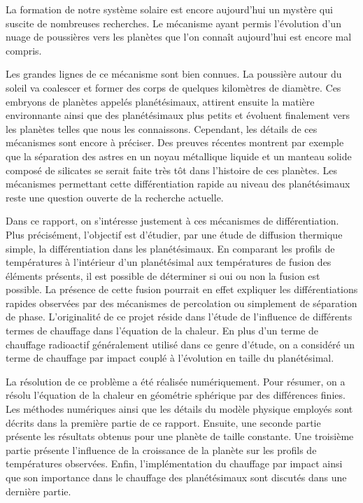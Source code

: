 \documentclass[10pt,a4paper]{article}
\numberwithin{equation}{section}
\begin{document}
La formation de notre système solaire est encore aujourd'hui un mystère qui suscite de nombreuses recherches. Le mécanisme ayant permis l'évolution d'un nuage de poussières vers les planètes que l'on connaît aujourd'hui est encore mal compris. 
\medskip

Les grandes lignes de ce mécanisme sont bien connues. La poussière autour du soleil va coalescer et former des corps de quelques kilomètres de diamètre. Ces embryons de planètes appelés planétésimaux, attirent ensuite la matière environnante ainsi que des planétésimaux plus petits et évoluent finalement vers les planètes telles que nous les connaissons.
Cependant, les détails de ces mécanismes sont encore à préciser. Des preuves récentes montrent par exemple que la séparation des astres en un noyau métallique liquide et un manteau solide composé de silicates se serait faite très tôt dans l'histoire de ces planètes. Les mécanismes permettant cette différentiation rapide au niveau des planétésimaux reste une question ouverte de la recherche actuelle. 
\medskip

Dans ce rapport, on s'intéresse justement à ces mécanismes de différentiation. Plus précisément, l'objectif est d'étudier, par une étude de diffusion thermique simple, la différentiation dans les planétésimaux. En comparant les profils de températures à l'intérieur d'un planétésimal aux températures de fusion des éléments présents, il est possible de déterminer si oui ou non la fusion est possible. La présence de cette fusion pourrait en effet expliquer les différentiations rapides observées par des mécanismes de percolation ou simplement de séparation de phase. 
L'originalité de ce projet réside dans l'étude de l'influence de différents termes de chauffage dans l'équation de la chaleur. En plus d'un terme de chauffage radioactif généralement utilisé dans ce genre d'étude, on a considéré un terme de chauffage par impact couplé à l'évolution en taille du planétésimal.
\medskip

La résolution de ce problème a été réalisée numériquement. Pour résumer, on a résolu l'équation de la chaleur en géométrie sphérique par des différences finies. Les méthodes numériques ainsi que les détails du modèle physique employés sont décrits dans la première partie de ce rapport. Ensuite, une seconde partie présente les résultats obtenus pour une planète de taille constante. Une troisième partie présente l'influence de la croissance de la planète sur les profils de températures observées. Enfin, l'implémentation du chauffage par impact ainsi que son importance dans le chauffage des planétésimaux sont discutés dans une dernière partie.
\end{document}
